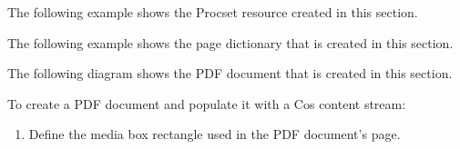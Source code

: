 \documentclass[letterpaper,12pt,english,openany,oneside]{sphinxmanual}
\begin{document}
\begin{sphinxVerbatim}[commandchars=\\\{\}]
  
 
 
 
 
 
\end{sphinxVerbatim}

The following example shows the Procset resource created in this section.

\begin{sphinxVerbatim}[commandchars=\\\{\}]
    
  
\PYG{p}{[}
 
\PYG{p}{]}
\end{sphinxVerbatim}

The following example shows the page dictionary that is created in this section.

\begin{sphinxVerbatim}[commandchars=\\\{\}]
    
  
 
 \PYG{p}{[}     \PYG{p}{]}
   
   
   
\end{sphinxVerbatim}

The following diagram shows the PDF document that is created in this section.

\noindent{}

To create a PDF document and populate it with a Cos content stream:
\begin{enumerate}
%
\item {} 
Define the media box rectangle used in the PDF document’s page.

\end{enumerate}
\end{document}
